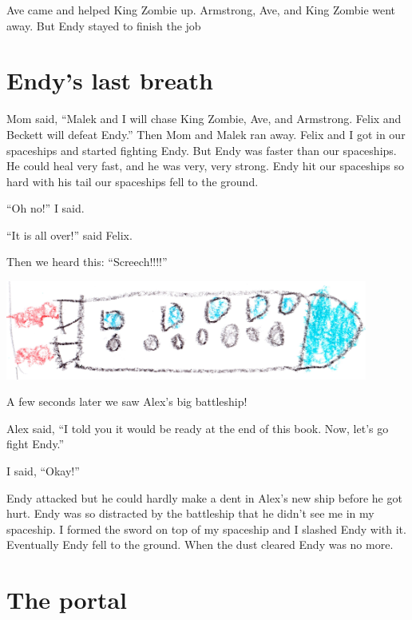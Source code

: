 \documentclass[booklet, twoside, 12pt]{krantz}
\begin{document}
Ave came and helped King Zombie up. Armstrong, Ave, and King Zombie went
away. But Endy stayed to finish the job

\hypertarget{endys-last-breath}{%
\section{Endy's last breath}\label{endys-last-breath}}

Mom said, ``Malek and I will chase King Zombie, Ave, and Armstrong.
Felix and Beckett will defeat Endy.'' Then Mom and Malek ran away. Felix
and I got in our spaceships and started fighting Endy. But Endy was
faster than our spaceships. He could heal very fast, and he was very,
very strong. Endy hit our spaceships so hard with his tail our
spaceships fell to the ground.

``Oh no!'' I said.

``It is all over!'' said Felix.

Then we heard this: ``Screech!!!!''

\includegraphics[width=4.6875in,height=\textheight]{img/four-bad-guys/longrocket.jpg}

A few seconds later we saw Alex's big battleship!

Alex said, ``I told you it would be ready at the end of this book. Now,
let's go fight Endy.''

I said, ``Okay!''

Endy attacked but he could hardly make a dent in Alex's new ship before
he got hurt. Endy was so distracted by the battleship that he didn't see
me in my spaceship. I formed the sword on top of my spaceship and I
slashed Endy with it. Eventually Endy fell to the ground. When the dust
cleared Endy was no more.

\hypertarget{the-portal}{%
\section{The portal}\label{the-portal}}
\end{document}
